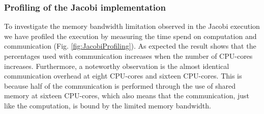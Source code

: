 \documentclass{sigplanconf}
\begin{document}
\subsubsection{Profiling of the Jacobi implementation}
To investigate the memory bandwidth limitation observed in the Jacobi execution we have profiled the execution by measuring the time spend on computation and communication (Fig. \ref{fig:JacobiProfiling}). As expected the result shows that the percentages used with communication increases when the number of CPU-cores increases. Furthermore, a noteworthy observation is the almost identical communication overhead at eight CPU-cores and sixteen CPU-cores. This is because half of the communication is performed through the use of shared memory at sixteen CPU-cores, which also means that the communication, just like the computation, is bound by the limited memory bandwidth.





\end{document}
